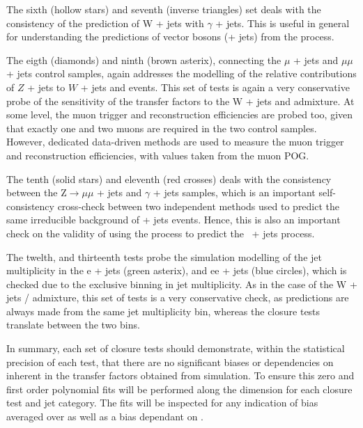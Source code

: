 The sixth (hollow stars) and seventh (inverse triangles) set deals 
with the consistency of the prediction of W + jets with $\gamma$ + jets.
This is useful in general for understanding the predictions of vector 
bosons (\ie \znunu + jets) from the \gj process. 


The eigth (diamonds) and ninth (brown asterix), connecting the $\mu$ + jets 
and $\mu\mu$ + jets control samples, again addresses the modelling of 
the relative contributions of $Z$ + jets to $W$ + jets and \ttbar events.
This set of tests is again a very conservative probe of the sensitivity of the
transfer factors to the W + jets and \ttbar admixture. At some
level, the muon trigger and reconstruction efficiencies are probed
too, given that exactly one and two muons are required in the two
control samples. However, dedicated data-driven methods are used to
measure the muon trigger and reconstruction efficiencies, with values
taken from the muon POG.

The tenth (solid stars) and eleventh (red crosses) deals with the consistency between the
Z$\rightarrow\mu\mu$ + jets and $\gamma$ + jets samples, which is an
important self-consistency cross-check between two independent methods
used to predict the same irreducible background of \znunu + jets
events. Hence, this is also an important check on the validity of
using the \gj process to predict the \znunu\, + jets process.

The twelth, and thirteenth tests probe the simulation modelling of
the jet multiplicity in the e + jets (green asterix), and ee + jets 
(blue circles), which is checked due to the exclusive binning in jet multiplicity.
As in the case of the W + jets / \ttbar admixture, this set of tests is a very 
conservative check, as predictions are always made from the same 
jet multiplicity bin, whereas the closure tests translate between the two bins.

In summary, each set of closure tests should demonstrate, within the
statistical precision of each test, that there are no significant
biases or dependencies on \scalht inherent in the transfer factors
obtained from simulation. To ensure this zero and first order polynomial
fits will be performed along the \scalht dimension for each closure test 
and jet category. The fits will be inspected for any indication of bias 
averaged over \scalht as well as a bias dependant on \scalht. 

